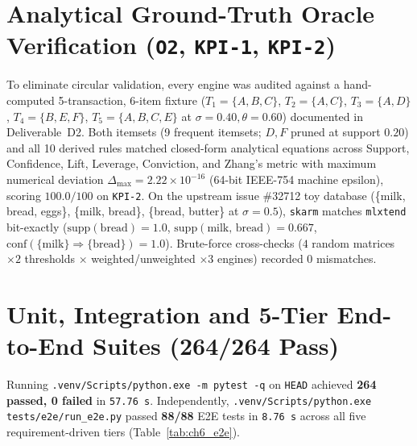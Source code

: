 \section{Analytical Ground-Truth Oracle Verification (\texttt{O2}, \texttt{KPI-1}, \texttt{KPI-2})}
To eliminate circular validation, every engine was audited against a hand-computed 5-transaction, 6-item fixture ($T_1=\{A,B,C\}$, $T_2=\{A,C\}$, $T_3=\{A,D\}$, $T_4=\{B,E,F\}$, $T_5=\{A,B,C,E\}$ at $\sigma=0.40, \theta=0.60$) documented in Deliverable~D2. Both itemsets (9 frequent itemsets; $D,F$ pruned at support $0.20$) and all 10 derived rules matched closed-form analytical equations across Support, Confidence, Lift, Leverage, Conviction, and Zhang's metric with maximum numerical deviation $\Delta_{\max} = 2.22 \times 10^{-16}$ (64-bit IEEE-754 machine epsilon), scoring $100.0/100$ on \texttt{KPI-2}. On the upstream issue \#32712 toy database (\{milk, bread, eggs\}, \{milk, bread\}, \{bread, butter\} at $\sigma=0.5$), \texttt{skarm} matches \texttt{mlxtend} bit-exactly ($\mathrm{supp}(\text{bread})=1.0$, $\mathrm{supp}(\text{milk, bread})=0.667$, $\mathrm{conf}(\{\text{milk}\}\Rightarrow\{\text{bread}\})=1.0$). Brute-force cross-checks ($4$ random matrices $\times 2$ thresholds $\times$ weighted/unweighted $\times 3$ engines) recorded $0$ mismatches.

\section{Unit, Integration and 5-Tier End-to-End Suites (264/264 Pass)}
Running \texttt{.venv/\protect\allowbreak{}Scripts/\protect\allowbreak{}python.exe -m pytest -q} on \texttt{HEAD} achieved \textbf{264 passed, 0 failed} in \texttt{57.76 s}. Independently, \texttt{.venv/Scripts/python.exe tests/e2e/run\_\protect\allowbreak{}e2e.py} passed \textbf{88/88} E2E tests in \texttt{8.76 s} across all five requirement-driven tiers (Table~\ref{tab:ch6_e2e}).

